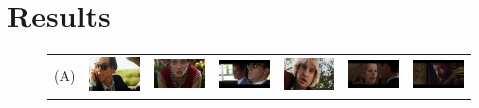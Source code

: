 \section*{Results}
\begin{figure}[t!]
\begin{center}
\begin{tabular}{ccccccc}
\large{(A)}
& \includegraphics[width=0.12\linewidth]
  {fig/close-ups/01.jpg} 
& \includegraphics[width=0.12\linewidth]
  {fig/close-ups/02.jpg}  
& \includegraphics[width=0.12\linewidth]
  {fig/close-ups/10.jpg}   
& \includegraphics[width=0.12\linewidth]
  {fig/close-ups/15.jpg}
& \includegraphics[width=0.12\linewidth]
  {fig/close-ups/05.jpg} 
& \includegraphics[width=0.12\linewidth]
  {fig/close-ups/06.jpg}  
\\
\end{tabular}


\end{center}
\end{figure}
